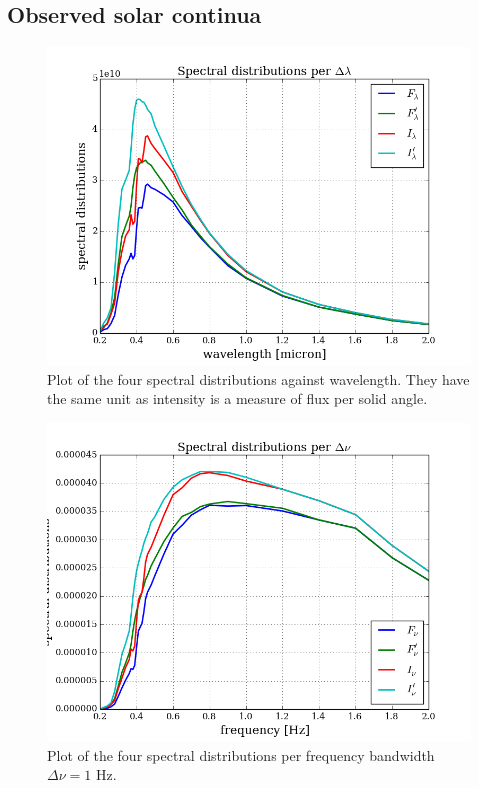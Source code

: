 \documentclass{article}
\begin{document}
\subsection{Observed solar continua}
\begin{figure}[H]
  \centering
  \includegraphics[scale=0.5]{../figures/task2/solspect_lambda_spec_dist.png}
  \caption{Plot of the four spectral distributions against wavelength. They have the same unit as intensity is a measure of flux per solid angle.}
\end{figure}

\begin{figure}[H]
  \centering
  \includegraphics[scale=0.5]{../figures/task2/solspect_lambda_spec_dist_nu.png}
  \caption{Plot of the four spectral distributions per frequency bandwidth $\Delta \nu = 1$ Hz.}
\end{figure}
\end{document}
